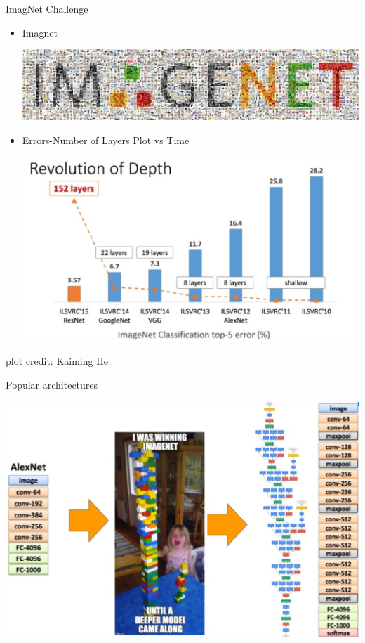 \documentclass{beamer}
\begin{document}
\begin{frame}{ImagNet Challenge}
	\begin{itemize}
		\item   Imagnet		
		
		\begin{center}
			\includegraphics[scale=0.2]{img/imn}
		\end{center} 

		\item   Errors-Number of Layers Plot vs Time 
		\begin{center}
			\includegraphics[scale=0.2]{img/dr}
		\end{center} 
			\end{itemize}
		plot credit: Kaiming He
\end{frame}

\begin{frame}{Popular architectures}
		\begin{center}
			\includegraphics[scale=0.23]{img/im2}
		\end{center} 
\end{frame}
\end{document}
